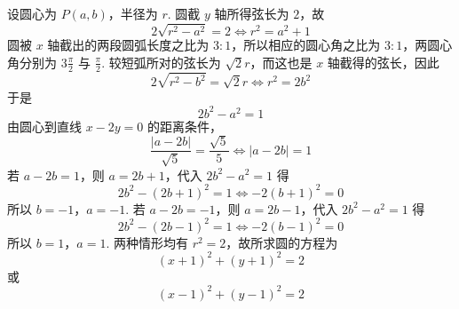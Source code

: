 \begin{solution}
设圆心为 \(P(a,b)\)，半径为 \(r\). 圆截 \(y\) 轴所得弦长为 \(2\)，故
\[
2\sqrt{r^2-a^2}=2
\iff r^2=a^2+1
\]
圆被 \(x\) 轴截出的两段圆弧长度之比为 \(3:1\)，所以相应的圆心角之比为 \(3:1\)，两圆心角分别为 \(3\frac{\pi}{2}\) 与 \(\frac{\pi}{2}\). 较短弧所对的弦长为 \(\sqrt2r\)，而这也是 \(x\) 轴截得的弦长，因此
\[
2\sqrt{r^2-b^2}=\sqrt2r
\iff r^2=2b^2
\]
于是
\[
2b^2-a^2=1
\]
由圆心到直线 \(x-2y=0\) 的距离条件，
\[
\frac{|a-2b|}{\sqrt5}=\frac{\sqrt5}{5}
\iff |a-2b|=1
\]
若 \(a-2b=1\)，则 \(a=2b+1\)，代入 \(2b^2-a^2=1\) 得
\[
2b^2-(2b+1)^2=1
\iff -2(b+1)^2=0
\]
所以 \(b=-1\)，\(a=-1\). 若 \(a-2b=-1\)，则 \(a=2b-1\)，代入 \(2b^2-a^2=1\) 得
\[
2b^2-(2b-1)^2=1
\iff -2(b-1)^2=0
\]
所以 \(b=1\)，\(a=1\). 两种情形均有 \(r^2=2\)，故所求圆的方程为
\[
(x+1)^2+(y+1)^2=2
\]
或
\[
(x-1)^2+(y-1)^2=2
\]
\end{solution}
